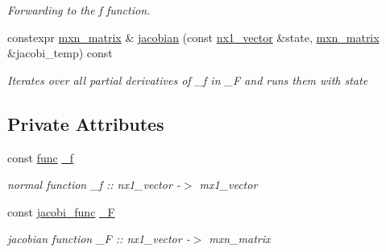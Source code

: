 \begin{DoxyCompactItemize}
\begin{DoxyCompactList}\small\item\em Forwarding to the \textquotesingle{}f\textquotesingle{} function. \end{DoxyCompactList}\item 
constexpr \hyperlink{classkafi_1_1jacobian__function_afdc859dfbc351b172814b235b577413f}{mxn\+\_\+matrix} \& \hyperlink{classkafi_1_1jacobian__function_a769dbc859c0bbc91f2104e31a81b86aa}{jacobian} (const \hyperlink{classkafi_1_1jacobian__function_ad7e7a8fbfa3e2785798bd46e5307ca65}{nx1\+\_\+vector} \&state, \hyperlink{classkafi_1_1jacobian__function_afdc859dfbc351b172814b235b577413f}{mxn\+\_\+matrix} \&jacobi\+\_\+temp) const
\begin{DoxyCompactList}\small\item\em Iterates over all partial derivatives of {\ttfamily \+\_\+f} in {\ttfamily \+\_\+F} and runs them with {\ttfamily state} \end{DoxyCompactList}\end{DoxyCompactItemize}
\subsection*{Private Attributes}
\begin{DoxyCompactItemize}
\item 
\mbox{\label{classkafi_1_1jacobian__function_ae551a0ef2e6ee9ca40f455bccbd5a3e3}} 
const \hyperlink{classkafi_1_1jacobian__function_a91cc300a9dba8c3e6787510d48e6fc37}{func} \hyperlink{classkafi_1_1jacobian__function_ae551a0ef2e6ee9ca40f455bccbd5a3e3}{\+\_\+f}
\begin{DoxyCompactList}\small\item\em normal function {\ttfamily \+\_\+f \+:\+: nx1\+\_\+vector -\/$>$ mx1\+\_\+vector} \end{DoxyCompactList}\item 
\mbox{\label{classkafi_1_1jacobian__function_a8a6149b733edc0b36c186fc060a3d976}} 
const \hyperlink{classkafi_1_1jacobian__function_ac8f4a65fbe71eb34d1b7914024ad2d85}{jacobi\+\_\+func} \hyperlink{classkafi_1_1jacobian__function_a8a6149b733edc0b36c186fc060a3d976}{\+\_\+F}
\begin{DoxyCompactList}\small\item\em jacobian function {\ttfamily \+\_\+F \+:\+: nx1\+\_\+vector -\/$>$ mxn\+\_\+matrix} \end{DoxyCompactList}\end{DoxyCompactItemize}


